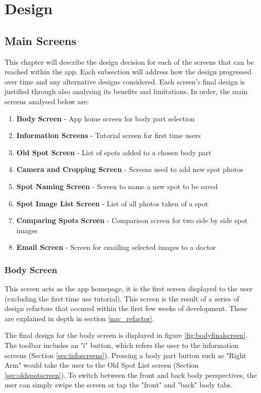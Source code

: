 \chapter{Design}
\section{Main Screens}
This chapter will describe the design decision for each of the screens that can be reached within the app. Each subsection will address how the design progressed over time and any alternative designs considered. Each screen's final design is justified through also analysing its benefits and limitations. In order, the main screens analysed below are:
\begin{enumerate}
    \item \textbf{Body Screen} - App home screen for body part selection 
    \item \textbf{Information Screens} - Tutorial screen for first time users
    \item \textbf{Old Spot Screen} - List of spots added to a chosen body part
    \item \textbf{Camera and Cropping Screen} - Screens used to add new spot photos
    \item \textbf{Spot Naming Screen} - Screen to name a new spot to be saved
    \item \textbf{Spot Image List Screen} - List of all photos taken of a spot
    \item \textbf{Comparing Spots Screen} - Comparison screen for two side by side spot images
    \item \textbf{Email Screen} - Screen for emailing selected images to a doctor
    
\end{enumerate}

\subsection{Body Screen}
This screen acts as the app homepage, it is the first screen displayed to the user (excluding the first time use tutorial). This screen is the result of a series of design refactors that occured within the first few weeks of development. These are explained in depth in section \ref{nav_refactor}. 

The final design for the body screen is displayed in figure \ref{fig:bodyfinalscreen}. The toolbar includes an "i" button, which refers the user to the information screens (Section \ref{sec:infoscreens}). Pressing a body part button such as "Right Arm" would take the user to the Old Spot List screen (Section \ref{sec:oldspotscreen}). To switch between the front and back body perspectives, the user can simply swipe the screen or tap the "front" and "back" body tabs.

